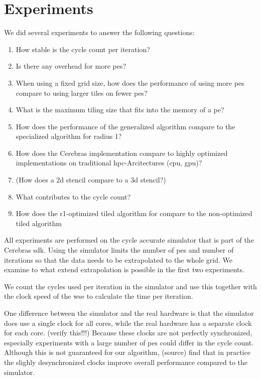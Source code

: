 \chapter{Experiments}
We did several experiments to answer the following questions:
\begin{enumerate}
    \item How stable is the cycle count per iteration?
    \item Is there any overhead for more \acp{pe}?
    \item When using a fixed grid size, how does the performance of using more \acp{pe} compare to using larger tiles on fewer \acp{pe}?
    \item What is the maximum tiling size that fits into the memory of a \ac{pe}?
    \item How does the performance of the generalized algorithm compare to the specialized algorithm for radius 1?
    \item How does the Cerebras implementation compare to highly optimized implementations on traditional \ac{hpc}-Arcitectures (\ac{cpu}, \ac{gpu})?
    \item (How does a 2d stencil compare to a 3d stencil?)
    \item What contributes to the cycle count?
    \item How does the r1-optimized tiled algorithm for compare to the non-optimized tiled algorithm
\end{enumerate}

All experiments are performed on the cycle accurate simulator that is part of the Cerebras \ac{sdk}.
Using the simulator limits the number of \acp{pe} and number of iterations so that the data needs to be extrapolated to the whole grid.
We examine to what extend extrapolation is possible in the first two experiments.

We count the cycles used per iteration in the simulator and use this together with the clock speed of the \ac{wse} to calculate the time per iteration.

One difference between the simulator and the real hardware is that the simulator does use a single clock for all cores, while the real hardware has a separate clock for each core. (verify this!!!) Because these clocks are not perfectly synchronized, especially experiments with a large number of \acp{pe} could differ in the cycle count. Although this is not guaranteed for our algorithm, (source) find that in practice the slighly desynchronized clocks improve overall performance compared to the simulator. 

